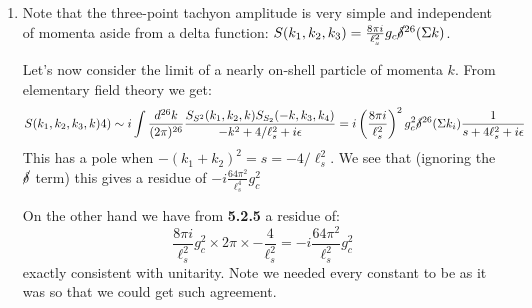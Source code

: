 \documentclass[11pt, class=article, crop=false]{standalone}
\begin{document}
\begin{enumerate}
	\item 
	Note that the three-point tachyon amplitude is very simple and independent of momenta aside from a delta function: $S(k_1, k_2, k_3) = \frac{8 \pi i}{\ell_s^2} g_c \cancel\delta^{26}(\Sigma k)$. 
	
	Let's now consider the limit of a nearly on-shell particle of momenta $k$. From elementary field theory we get:
	\[
		S(k_1, k_2, k_3, k)4) \sim i \int \frac{d^{26} k}{(2\pi)^{26}} \frac{S_{S^2} (k_1, k_2, k) S_{S_2} (-k, k_3, k_4)}{-k^2 + 4/\ell_s^2 + i \epsilon} = i \left(\frac{8 \pi i}{\ell_s^2}\right)^2 g_c^2 \cancel\delta^{26} (\Sigma k_i) \frac{1}{s + 4 \ell_s^2 + i \epsilon}
	\]
	This has a pole when $-(k_1 + k_2)^2 = s = -4/\ell_s^2$. We see that (ignoring the $\cancel\delta$ term) this gives a residue of $-i\frac{64 \pi^2}{\ell_s^4} g_c^2$
	
	On the other hand we have from \textbf{5.2.5} a residue of:
	\[
		\frac{8 \pi i}{\ell_s^2} g_c^2 \times 2\pi \times -\frac{4}{\ell_s^2} = - i \frac{64 \pi^2}{\ell_s^2} g_c^2
	\]
	exactly consistent with unitarity. Note we needed every constant to be as it was so that we could get such agreement. 
	

\end{enumerate}
\end{document}
